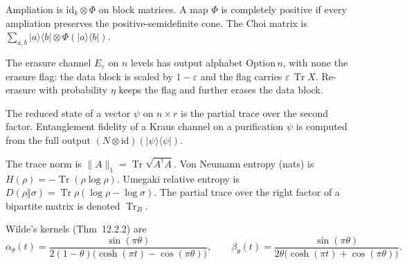 \begin{definition}
  \label{def:choi}
  Ampliation is $\mathrm{id}_k \otimes \Phi$ on block matrices. A map $\Phi$ is
  completely positive if every ampliation preserves the positive-semidefinite
  cone. The Choi matrix is $\sum_{a,b} \lvert a\rangle\langle b\rvert \otimes \Phi(\lvert a\rangle\langle b\rvert)$.
\end{definition}

\begin{definition}
  \label{def:erasure}
  The erasure channel $E_\varepsilon$ on $n$ levels has output alphabet
  $\mathrm{Option}\,n$, with $\mathrm{none}$ the erasure flag: the data block is
  scaled by $1-\varepsilon$ and the flag carries $\varepsilon\,\operatorname{Tr} X$.
  Re-erasure with probability $\eta$ keeps the flag and further erases the data
  block.
\end{definition}

\begin{definition}
  \label{def:entFid}
  The reduced state of a vector $\psi$ on $n\times r$ is the partial trace over
  the second factor. Entanglement fidelity of a Kraus channel on a purification
  $\psi$ is computed from the full output $(N\otimes \mathrm{id})(\lvert\psi\rangle\langle\psi\rvert)$.
\end{definition}

\begin{definition}
  \label{def:traceNorm}
  The trace norm is $\lVert A\rVert_1 = \operatorname{Tr}\sqrt{A^\dagger A}$.
  Von Neumann entropy (nats) is $H(\rho) = -\operatorname{Tr}(\rho\log\rho)$.
  Umegaki relative entropy is $D(\rho\Vert\sigma) = \operatorname{Tr}\rho(\log\rho-\log\sigma)$.
  The partial trace over the right factor of a bipartite matrix is denoted
  $\operatorname{Tr}_B$.
\end{definition}

\begin{definition}
  \label{def:hirschmanKernels}
  Wilde's kernels (Thm~12.2.2) are
  \[
    \alpha_\theta(t)
      = \frac{\sin(\pi\theta)}{2(1-\theta)\bigl(\cosh(\pi t)-\cos(\pi\theta)\bigr)},
    \qquad
    \beta_\theta(t)
      = \frac{\sin(\pi\theta)}{2\theta\bigl(\cosh(\pi t)+\cos(\pi\theta)\bigr)}.
  \]
\end{definition}

